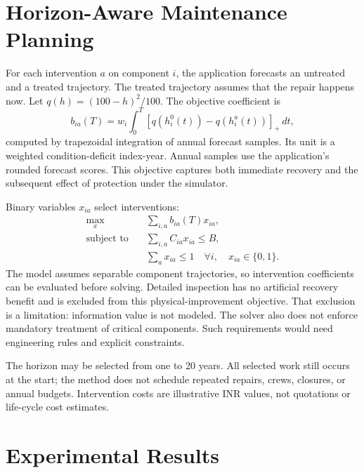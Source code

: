 \documentclass[conference]{IEEEtran}
\begin{document}
\section{Horizon-Aware Maintenance Planning}
For each intervention $a$ on component $i$, the application forecasts an untreated and a treated trajectory. The treated trajectory assumes that the repair happens now. Let $q(h)=(100-h)^2/100$. The objective coefficient is
\begin{equation}
b_{ia}(T)=w_i\int_0^T [q(h_i^0(t))-q(h_i^a(t))]_+\,dt,
\end{equation}
computed by trapezoidal integration of annual forecast samples. Its unit is a weighted condition-deficit index-year. Annual samples use the application's rounded forecast scores. This objective captures both immediate recovery and the subsequent effect of protection under the simulator.

Binary variables $x_{ia}$ select interventions:
\begin{align}
\max_x\quad &\sum_{i,a} b_{ia}(T)x_{ia},\\
\text{subject to}\quad &\sum_{i,a} C_{ia}x_{ia}\leq B,\\
&\sum_a x_{ia}\leq 1\quad\forall i,\quad x_{ia}\in\{0,1\}.
\end{align}
The model assumes separable component trajectories, so intervention coefficients can be evaluated before solving. Detailed inspection has no artificial recovery benefit and is excluded from this physical-improvement objective. That exclusion is a limitation: information value is not modeled. The solver also does not enforce mandatory treatment of critical components. Such requirements would need engineering rules and explicit constraints.

The horizon may be selected from one to 20 years. All selected work still occurs at the start; the method does not schedule repeated repairs, crews, closures, or annual budgets. Intervention costs are illustrative INR values, not quotations or life-cycle cost estimates.

\section{Experimental Results}
\end{document}
